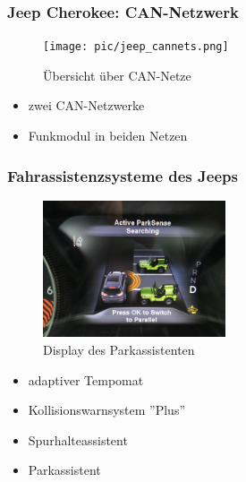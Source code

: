 \documentclass[t]{beamer}
\begin{document}
\begin{frame}
	\frametitle{Jeep Cherokee: CAN-Netzwerk}
    \begin{figure}
		\texttt{[image: pic/jeep\_cannets.png]}
        \caption{Übersicht über CAN-Netze \cite{MiV15}}
	\end{figure}
    \begin{itemize}
		\item zwei CAN-Netzwerke
        \item Funkmodul in beiden Netzen
	\end{itemize}
\end{frame}

\begin{frame}
    \frametitle{Fahrassistenzsysteme des Jeeps}
    \begin{figure}
        \includegraphics[width=0.48\textwidth]{pic/jeep_parkass.png}
        \caption{Display des Parkassistenten \cite{MiV15}}
    \end{figure}
    \begin{itemize}
        \item adaptiver Tempomat
        \item Kollisionswarnsystem ''Plus''
        \item Spurhalteassistent
        \item Parkassistent
    \end{itemize}
\end{frame}
\end{document}
